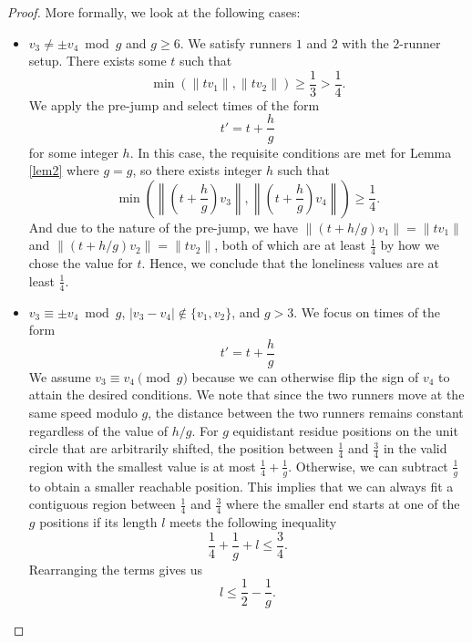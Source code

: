 \documentclass[11pt]{amsart}
\newcommand{\norm}[1]{\lVert #1 \rVert}
\newcommand{\Norm}[1]{\left\lVert #1 \right\rVert}
\begin{document}
\begin{proof}
    
    More formally, we look at the following cases:
    \begin{itemize}
        \item $v_3 \neq \pm v_4 \bmod g$ and $g \geq 6$. We satisfy runners $1$ and $2$ with the $2$-runner setup. There exists some $t$ such that
        $$\min(\norm{tv_1},\norm{tv_2}) \geq \frac{1}{3} > \frac{1}{4}.$$
        We apply the pre-jump and select times of the form
        $$t' = t + \frac{h}{g}$$
        for some integer $h$. In this case, the requisite conditions are met for Lemma \ref{lem2} where $g = g$, so there exists integer $h$ such that
        $$\min\left(\Norm{\left(t + \frac{h}{g}\right)v_3},\Norm{\left(t + \frac{h}{g}\right)v_4}\right) \geq \frac{1}{4}.$$
        And due to the nature of the pre-jump, we have $\norm{(t + h / g)v_1} = \norm{tv_1}$ and $\norm{(t + h / g)v_2} = \norm{tv_2}$, both of which are at least $\frac{1}{4}$ by how we chose the value for $t$. Hence, we conclude that the loneliness values are at least $\frac{1}{4}$.
        \item $v_3 \equiv \pm v_4 \bmod g$, $|v_3 - v_4| \not\in \{v_1, v_2\}$, and $g > 3$. We focus on times of the form
        $$t' = t + \frac{h}{g}$$        
        We assume $v_3 \equiv v_4 \pmod g$ because we can otherwise flip the sign of $v_4$ to attain the desired conditions. We note that since the two runners move at the same speed modulo $g$, the distance between the two runners remains constant regardless of the value of $h / g$. For $g$ equidistant residue positions on the unit circle that are arbitrarily shifted, the position between $\frac{1}{4}$ and $\frac{3}{4}$ in the valid region with the smallest value is at most $\frac{1}{4} + \frac{1}{g}$. Otherwise, we can subtract $\frac{1}{g}$ to obtain a smaller reachable position. This implies that we can always fit a contiguous region between $\frac{1}{4}$ and $\frac{3}{4}$ where the smaller end starts at one of the $g$ positions if its length $l$ meets the following inequality
        $$\frac{1}{4} + \frac{1}{g} + l \leq \frac{3}{4}.$$
        Rearranging the terms gives us
        $$l \leq \frac{1}{2} - \frac{1}{g}.$$

\end{itemize}
\end{proof}
\end{document}
